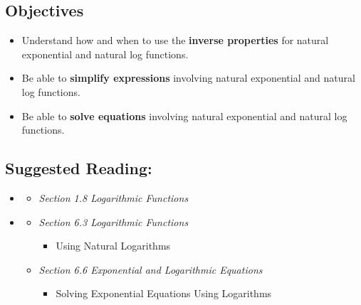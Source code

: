 \vspace{-0.25 in}
\begin{framed}
\subsection*{Objectives}
\begin{itemize}
    \item Understand how and when to use the \textbf{inverse properties} for natural exponential and natural log functions.
    \item Be able to \textbf{simplify expressions} involving natural exponential and natural log functions.
    \item Be able to \textbf{solve equations} involving natural exponential and natural log functions.
\end{itemize}

\subsection*{Suggested Reading:}
\begin{itemize}
\item \cite{Calaway}\footnotemark[1]
   \begin{itemize}
        \item \emph{Section 1.8 Logarithmic Functions}
    \end{itemize}

\item \cite{openstaxColAlgebra}\footnotemark[2]
    \begin{itemize}
        \item \emph{Section 6.3 Logarithmic Functions}
       \begin{itemize}
           \item Using Natural Logarithms
       \end{itemize}
       \item \emph{Section 6.6 Exponential and Logarithmic Equations}
       \begin{itemize}
           \item Solving Exponential Equations Using Logarithms
       \end{itemize}
    \end{itemize}

\end{itemize}

\end{framed}
